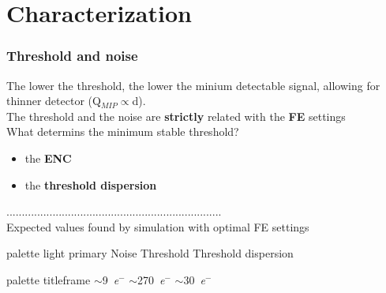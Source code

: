 \section{Characterization}
    \begin{frame}
        \frametitle{Threshold and noise}\medskip
        The lower the threshold, the lower the minium detectable signal, allowing for thinner detector (Q$_{MIP}\propto$d). \\
        \medskip
        The threshold and the noise are \textbf{strictly} related with the \textbf{FE} settings\\
        \medskip
        What determins the minimum stable threshold?
        \begin{itemize}
            \item the \textbf{ENC} 
            \item the \textbf{threshold dispersion} 
        \end{itemize}
        \medskip
        \centering ......................................................................\\\medskip
        \centering Expected values found by simulation with optimal FE settings %
        \begin{center}
        \begin{beamercolorbox}[rounded=true, center]{palette light primary}
            Noise \hspace*{1.2cm} Threshold \hspace*{1.2cm} Threshold dispersion
        \end{beamercolorbox}
        \begin{beamercolorbox}[rounded=true, center]{palette titleframe}
            \hspace*{-2.4cm} $\sim$\SI{9}{\elementarycharge}$^-$ \hspace*{1.4cm} $\sim$\SI{270}{\elementarycharge}$^-$ \hspace*{1.2cm} $\sim$\SI{30}{\elementarycharge}$^-$
        \end{beamercolorbox}
    \end{center}
    \end{frame}


